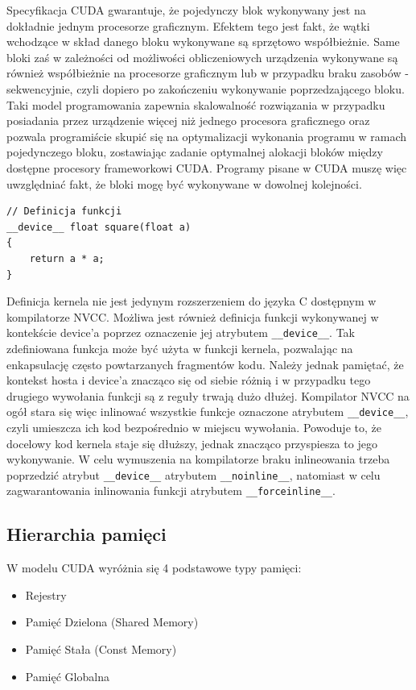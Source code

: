 Specyfikacja CUDA gwarantuje, że pojedynczy blok wykonywany jest na
dokładnie jednym procesorze graficznym. Efektem tego jest fakt, że wątki wchodzące w
skład danego bloku wykonywane są sprzętowo współbieżnie. Same bloki zaś w zależności od
możliwości obliczeniowych urządzenia wykonywane są również
współbieżnie na procesorze graficznym lub w przypadku braku zasobów -
sekwencyjnie, czyli dopiero po
zakończeniu wykonywanie poprzedzającego bloku. Taki model programowania zapewnia
skalowalność rozwiązania w przypadku posiadania przez urządzenie więcej niż
jednego procesora graficznego oraz pozwala programiście skupić się na
optymalizacji wykonania programu w ramach pojedynczego bloku, zostawiając
zadanie optymalnej alokacji bloków między dostępne procesory 
frameworkowi CUDA. Programy pisane w CUDA muszę więc uwzględniać fakt,
że bloki mogę być wykonywane w dowolnej kolejności. 


\begin{lstlisting}[caption=Funkcje CUDA, label=func]
// Definicja funkcji
__device__ float square(float a)
{
	return a * a;
}
\end{lstlisting}

Definicja kernela nie jest jedynym rozszerzeniem do języka C dostępnym w
kompilatorze NVCC. Możliwa jest również definicja funkcji wykonywanej w
kontekście device'a poprzez oznaczenie jej atrybutem \texttt{\_\_device\_\_}. Tak
zdefiniowana funkcja może być użyta w funkcji kernela, pozwalając na
enkapsulację często powtarzanych fragmentów kodu. Należy jednak
pamiętać, że kontekst hosta i device'a znacząco się od siebie różnią i w
przypadku tego drugiego wywołania funkcji są z reguły trwają dużo dłużej.
Kompilator NVCC na ogół stara się więc inlinować wszystkie funkcje
oznaczone atrybutem \texttt{\_\_device\_\_}, czyli umieszcza ich kod bezpośrednio
w miejscu wywołania. Powoduje to, że docelowy kod kernela staje się
dłuższy, jednak znacząco przyspiesza to jego wykonywanie. W celu wymuszenia na
kompilatorze braku inlineowania trzeba poprzedzić atrybut
\texttt{\_\_device\_\_} atrybutem \texttt{\_\_noinline\_\_}, natomiast w celu
zagwarantowania inlinowania funkcji atrybutem \texttt{\_\_forceinline\_\_}.

\subsection{Hierarchia pamięci}

W modelu CUDA wyróżnia się 4 podstawowe typy pamięci:
\begin{itemize}
\item Rejestry
\item Pamięć Dzielona (Shared Memory)
\item Pamięć Stała (Const Memory)
\item Pamięć Globalna
\end{itemize}

